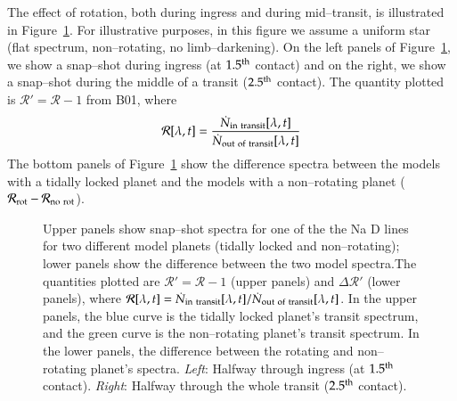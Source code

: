 The effect of rotation, both during ingress and during mid--transit,
is illustrated in Figure~\ref{rot_fig:spec. and diff.}.  For
illustrative purposes, in this figure we assume a uniform star (flat
spectrum, non--rotating, no limb--darkening).  On the left panels of
Figure~\ref{rot_fig:spec. and diff.}, we show a snap--shot during
ingress (at $1.5^{\rm th}$ contact) and on the right, we show a
snap--shot during the middle of a transit ($2.5^{\rm th}$ contact).
The quantity plotted is $\mathcal{R}' = \mathcal{R}-1$ from B01, where
\begin{equation}
\mathcal{R}[\lambda,t] = \frac{\dot{N}_{\rm in~transit}[\lambda,t]}{\dot{N}_{\rm out~of~transit}[\lambda,t]}
\label{rot_eq:Brown R}
\end{equation}
The bottom panels of Figure~\ref{rot_fig:spec. and diff.} show the
difference spectra between the models with a tidally locked planet and
the models with a non--rotating planet ($\mathcal{R}_{\rm rot} -
\mathcal{R}_{\rm no~rot}$).
\begin{figure}[p]
\caption[Na D line spectra, rot. vs. non-rot; and difference.]{Upper
panels show snap--shot spectra for one of the the Na D lines for two
different model planets (tidally locked and non--rotating); lower
panels show the difference between the two model spectra.The
quantities plotted are $\mathcal{R}' = \mathcal{R}-1$ (upper panels)
and $\Delta \mathcal{R}'$ (lower panels), where
$\mathcal{R}[\lambda,t] = \dot{N}_{\rm
in~transit}[\lambda,t]/\dot{N}_{\rm out~of~transit}[\lambda,t]$.  In
the upper panels, the blue curve is the tidally locked planet's
transit spectrum, and the green curve is the non--rotating planet's
transit spectrum.  In the lower panels, the difference between the
rotating and non--rotating planet's spectra.  {\it Left}: Halfway
through ingress (at $1.5^{\rm th}$ contact).  {\it Right}: Halfway
through the whole transit ($2.5^{\rm th}$ contact).}
\label{rot_fig:spec. and diff.}
\end{figure}
\afterpage{\clearpage}

